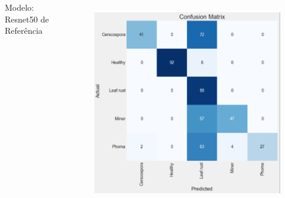 \documentclass[aspectratio=169]{beamer}
\begin{document}
\begin{frame}
\begin{columns}
        \centering
        \tiny Modelo: Resnet50 de Referência
        \begin{figure}
            \centering
            \includegraphics[scale=0.35]{img/resnetdereferencia.png}
            \label{fig:enter-label}
        \end{figure}



    \end{columns}
\end{frame}



\end{document}
